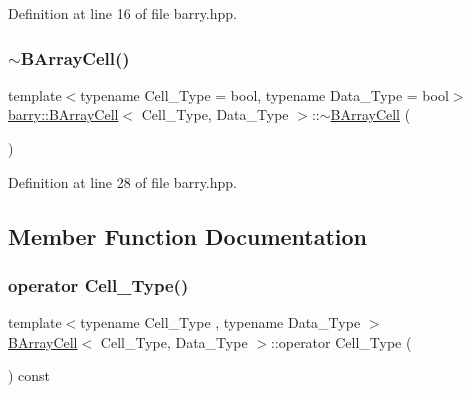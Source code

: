 Definition at line 16 of file barry.\+hpp.

\mbox{\label{classbarry_1_1_b_array_cell_a6d5c31a74e666b22889e81ca1b40c66b}} 
\subsubsection{\texorpdfstring{$\sim$\+B\+Array\+Cell()}{~BArrayCell()}}
{\footnotesize\ttfamily template$<$typename Cell\+\_\+\+Type  = bool, typename Data\+\_\+\+Type  = bool$>$ \\
\hyperlink{classbarry_1_1_b_array_cell}{barry\+::\+B\+Array\+Cell}$<$ Cell\+\_\+\+Type, Data\+\_\+\+Type $>$\+::$\sim$\hyperlink{classbarry_1_1_b_array_cell}{B\+Array\+Cell} (\begin{DoxyParamCaption}{ }\end{DoxyParamCaption})\hspace{0.3cm}{\ttfamily [inline]}}



Definition at line 28 of file barry.\+hpp.



\subsection{Member Function Documentation}
\mbox{\label{classbarry_1_1_b_array_cell_a698f664c230f91bf03a97966378e339b}} 
\subsubsection{\texorpdfstring{operator Cell\+\_\+\+Type()}{operator Cell\_Type()}}
{\footnotesize\ttfamily template$<$typename Cell\+\_\+\+Type , typename Data\+\_\+\+Type $>$ \\
\hyperlink{classbarry_1_1_b_array_cell}{B\+Array\+Cell}$<$ Cell\+\_\+\+Type, Data\+\_\+\+Type $>$\+::operator Cell\+\_\+\+Type (\begin{DoxyParamCaption}{ }\end{DoxyParamCaption}) const\hspace{0.3cm}{\ttfamily [inline]}}



